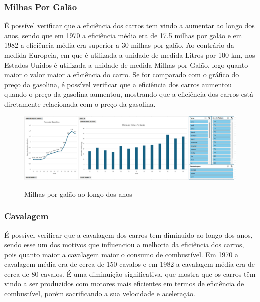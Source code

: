 \documentclass[a4paper]{article}
\begin{document}
\subsubsection{Milhas Por Galão}
É possível verificar que a eficiência dos carros tem vindo a aumentar ao longo dos anos,
sendo que em 1970 a eficiência média era de 17.5 milhas por galão e em 1982 a eficiência média 
era superior a 30 milhas por galão. Ao contrário da medida Europeia, em que é utilizada a unidade de medida
Litros por 100 km, nos Estados Unidos é utilizada a unidade de medida Milhas por Galão, logo quanto maior o valor
maior a eficiência do carro.
Se for comparado com o gráfico do preço da gasolina, é possível verificar que a eficiência dos carros aumentou
quando o preço da gasolina aumentou, mostrando que a eficiência dos carros está diretamente relacionada com o preço da gasolina.

\begin{figure}[h!]
    \raggedright
    \includegraphics[width=1.2\textwidth]{Recursos/MilhasPorGalaoGrafico.png}
    \vspace{0.5cm}
    \label{fig:mpg}
    \caption{Milhas por galão ao longo dos anos}
\end{figure}
\newpage



\subsubsection{Cavalagem}
É possível verificar que a cavalagem dos carros tem diminuido ao longo dos anos, sendo esse um dos motivos
que influenciou a melhoria da eficiência dos carros, pois quanto maior a cavalagem maior o consumo de combustível.
Em 1970 a cavalagem média era de cerca de 150 cavalos e em 1982 a cavalagem média era de cerca de 80 cavalos.
É uma diminuição significativa, que mostra que os carros têm vindo a ser produzidos com motores mais eficientes em termos
de eficiência de combustível, porém sacrificando a sua velocidade e aceleração.
\end{document}
